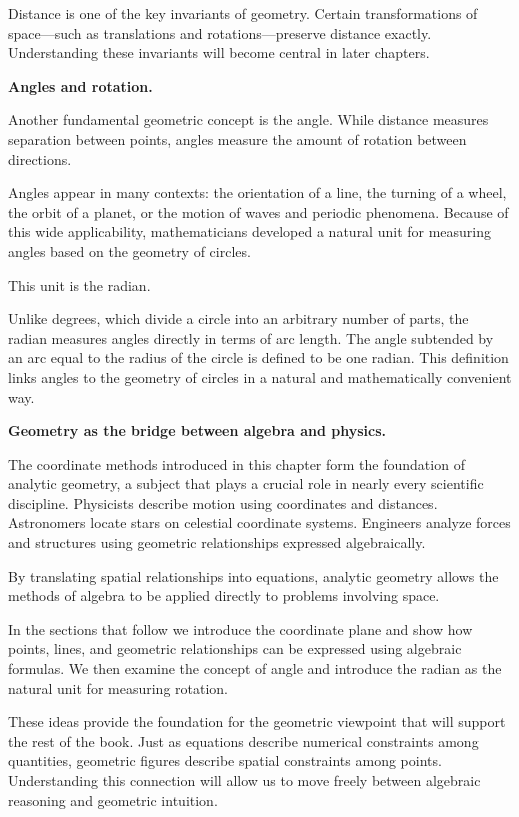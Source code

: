 \documentclass[11pt, openany]{book}
\theoremstyle{plain}
\theoremstyle{definition}
\theoremstyle{remark}
\begin{document}
Distance is one of the key invariants of geometry. Certain
transformations of space—such as translations and rotations—preserve
distance exactly. Understanding these invariants will become central in
later chapters.

\medskip

\textbf{Angles and rotation.}

Another fundamental geometric concept is the angle. While distance
measures separation between points, angles measure the amount of
rotation between directions.

Angles appear in many contexts: the orientation of a line, the turning
of a wheel, the orbit of a planet, or the motion of waves and periodic
phenomena. Because of this wide applicability, mathematicians developed
a natural unit for measuring angles based on the geometry of circles.

This unit is the radian.

Unlike degrees, which divide a circle into an arbitrary number of
parts, the radian measures angles directly in terms of arc length. The
angle subtended by an arc equal to the radius of the circle is defined
to be one radian. This definition links angles to the geometry of
circles in a natural and mathematically convenient way.

\medskip

\textbf{Geometry as the bridge between algebra and physics.}

The coordinate methods introduced in this chapter form the foundation of
analytic geometry, a subject that plays a crucial role in nearly every
scientific discipline. Physicists describe motion using coordinates and
distances. Astronomers locate stars on celestial coordinate systems.
Engineers analyze forces and structures using geometric relationships
expressed algebraically.

By translating spatial relationships into equations, analytic geometry
allows the methods of algebra to be applied directly to problems
involving space.

\medskip

In the sections that follow we introduce the coordinate plane and show
how points, lines, and geometric relationships can be expressed using
algebraic formulas. We then examine the concept of angle and introduce
the radian as the natural unit for measuring rotation.

These ideas provide the foundation for the geometric viewpoint that will
support the rest of the book. Just as equations describe numerical
constraints among quantities, geometric figures describe spatial
constraints among points. Understanding this connection will allow us to
move freely between algebraic reasoning and geometric intuition.
\end{document}
